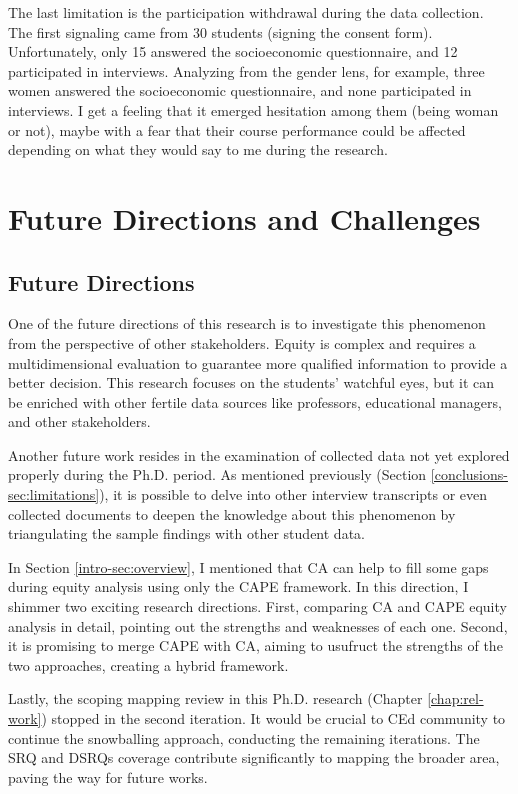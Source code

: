 The last limitation is the participation withdrawal during the data collection. The first signaling came from 30 students (signing the consent form). Unfortunately, only 15 answered the socioeconomic questionnaire, and 12 participated in interviews. Analyzing from the gender lens, for example, three women answered the socioeconomic questionnaire, and none participated in interviews. I get a feeling that it emerged hesitation among them (being woman or not), maybe with a fear that their course performance could be affected depending on what they would say to me during the research.

 \section{Future Directions and Challenges}
 \label{conclusions-sec:challenges}
 
\subsection{Future Directions}

One of the future directions of this research is to investigate this phenomenon from the perspective of other stakeholders. Equity is complex and requires a multidimensional evaluation to guarantee more qualified information to provide a better decision. This research focuses on the students' watchful eyes, but it can be enriched with other fertile data sources like professors, educational managers, and other stakeholders.

Another future work resides in the examination of collected data not yet explored properly during the \gls{Ph.D.} period. As mentioned previously (Section \ref{conclusions-sec:limitations}), it is possible to delve into other interview transcripts or even collected documents to deepen the knowledge about this phenomenon by triangulating the sample findings with other student data. 

In Section \ref{intro-sec:overview}, I mentioned that \gls{CA} can help to fill some gaps during equity analysis using only the
\gls{CAPE} framework. In this direction, I shimmer two exciting research directions. First, comparing \gls{CA} and \gls{CAPE} equity analysis in detail, pointing out the strengths and weaknesses of each one. Second, it is promising to merge \gls{CAPE} with \gls{CA}, aiming to usufruct the strengths of the two approaches, creating a hybrid framework.

Lastly, the scoping mapping review in this \gls{Ph.D.} research (Chapter \ref{chap:rel-work}) stopped in the second iteration. It would be crucial to \gls{CEd} community to continue the snowballing approach, conducting the remaining iterations. The \gls{SRQ} and \glspl{DSRQ} coverage contribute significantly to mapping the broader area, paving the way for future works.


